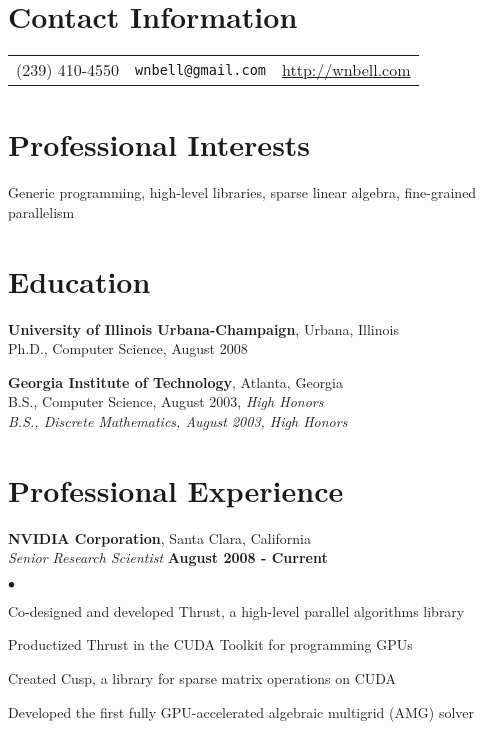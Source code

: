 \documentclass[margin,line]{res}
\newenvironment{list1}{
  \begin{list}{\ding{113}}{%
      \setlength{\itemsep}{0in}
      \setlength{\parsep}{0in} \setlength{\parskip}{0in}
      \setlength{\topsep}{0in} \setlength{\partopsep}{0in}
      \setlength{\leftmargin}{0.17in}}}{\end{list}}
\newenvironment{list2}{
  \begin{list}{$\bullet$}{%
      \setlength{\itemsep}{0in}
      \setlength{\parsep}{0in} \setlength{\parskip}{0in}
      \setlength{\topsep}{0in} \setlength{\partopsep}{0in}
      \setlength{\leftmargin}{0.2in}}}{\end{list}}
\begin{document}
\vspace*{-1.75cm}

\begin{resume}
\section{\sc Contact Information}
\vspace{.05in}
\begin{tabular}{@{}l|l|l}
(239) 410-4550 & \texttt{wnbell@gmail.com} & \url{http://wnbell.com} \\
\end{tabular}

\small
\section{\sc Professional Interests}
Generic programming, high-level libraries, sparse linear algebra, fine-grained parallelism

\section{\sc Education}
{\bf University of Illinois Urbana-Champaign}, Urbana, Illinois\\
Ph.D., Computer Science, August 2008

{\bf Georgia Institute of Technology}, Atlanta, Georgia\\
B.S., Computer Science, August 2003, \em High Honors\em \\
B.S., Discrete Mathematics, August 2003, \em High Honors\em

\section{\sc Professional Experience}
{\bf NVIDIA Corporation}, Santa Clara, California\\
{\em Senior Research Scientist} \hfill {\bf August 2008 - Current}\\
\vspace{-.3cm}
\begin{list2}
\item Co-designed and developed Thrust, a high-level parallel algorithms library 
\item Productized Thrust in the CUDA Toolkit for programming GPUs
\item Created Cusp, a library for sparse matrix operations on CUDA
\item Developed the first fully GPU-accelerated algebraic multigrid (AMG) solver
\end{list2}



\end{resume}
\end{document}

